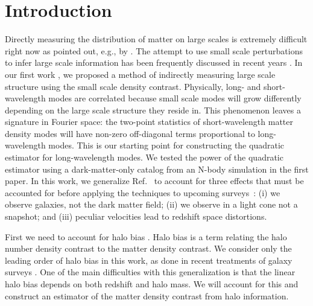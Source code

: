 \documentclass[prd,amsmath,amssymb,floatfix,superscriptaddress,nofootinbib,twocolumn]{revtex4-1}
\begin{document}
\section{Introduction} \label{sec1}
\noindent Directly measuring the distribution of matter on large scales is extremely difficult right now as pointed out, e.g., by \cite{Modi:2019hydr}. The attempt to use small scale perturbations to infer large scale information has been frequently discussed in recent years \cite{Baldauf:2011fer}\cite{Jeong:2012foss}\cite{Li:2014ssc}\cite{Zhu:2016tidal}\cite{Barreira:2017res}. In our first work \cite{Li:2020fir}, we proposed a method of indirectly measuring large scale structure using the small scale density contrast. Physically, long- and short-wavelength modes are correlated because small scale modes will grow differently depending on the large scale structure they reside in. This phenomenon leaves a signature in Fourier space: the two-point statistics of short-wavelength matter density modes will have non-zero off-diagonal terms proportional to long-wavelength modes. This is our starting point for constructing the quadratic estimator for long-wavelength modes. We tested the power of the quadratic estimator using a dark-matter-only catalog from an N-body simulation in the first paper. In this work, we generalize Ref.~\cite{Li:2020fir} to account for three effects that must be accounted for before applying the techniques to upcoming surveys~\cite{LSST:2012ls}\cite{Wfirst:2012jg}\cite{DESI:2019ds}: (i) we observe galaxies, not the dark matter field; (ii) we observe in a light cone not a snapshot; and (iii) peculiar velocities lead to redshift space distortions.

First we need to account for halo bias \cite{Kravtsov:1999hb}\cite{Desjacques:2018rev}. Halo bias is a term relating the halo number density contrast to the matter density contrast. We consider only the leading order of halo bias in this work, as done in recent treatments of galaxy surveys \cite{Seljak:2004sj}\cite{Chang:2016npo}\cite{Prat:2016xor}. One of the main difficulties with this generalization is that the linear halo bias depends on both redshift and halo mass. We will account for this and construct an estimator of the matter density contrast from halo information.
\end{document}
